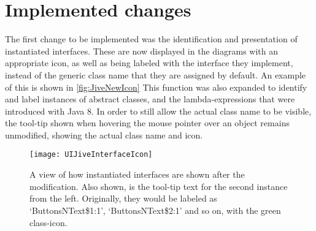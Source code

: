 \chapter{Implemented changes}\label{jiveImpl}%

The first change to be implemented was the identification and presentation of instantiated interfaces.
These are now displayed in the diagrams with an appropriate icon, as well as being labeled with the interface they implement, instead of the generic class name that they are assigned by default.
An example of this is shown in \autoref{fig:JiveNewIcon}
This function was also expanded to identify and label instances of abstract classes, and the lambda-expressions that were introduced with Java 8.
In order to still allow the actual class name to be visible, the tool-tip shown when hovering the mouse pointer over an object remains unmodified, showing the actual class name and icon.
\begin{figure}[H]
	\centering
	\texttt{[image: UIJiveInterfaceIcon]}
	\caption[A view of how instantiated interfaces are shown after the modification.]{A view of how instantiated interfaces are shown after the modification. Also shown, is the tool-tip text for the second instance from the left. Originally, they would be labeled as `ButtonsNText\$1:1', `ButtonsNText\$2:1' and so on, with the green class-icon.}
	\label{fig:JiveNewIcon}
\end{figure}

